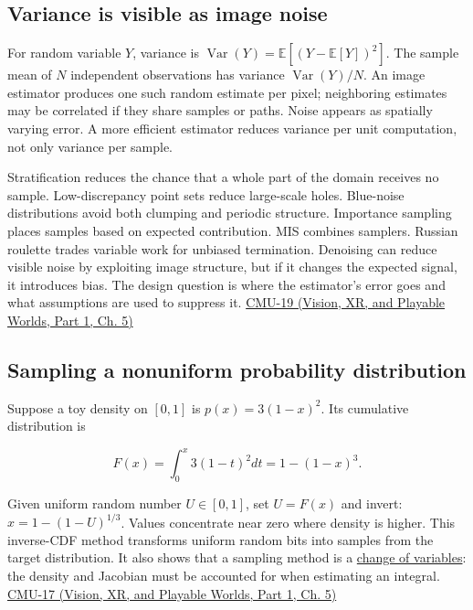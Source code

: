 \subsection{Variance is visible as image noise}\label{03-visual-computing-i-ch012-variance-is-visible-as-image-noise}

\hypertarget{03-visual-computing-i-ch012-variance-is-visible-as-image-noise}{}

For random variable \(Y\), variance is \(\operatorname{Var}(Y)=\mathbb E[(Y-\mathbb E[Y])^2]\). The sample mean of \(N\) independent observations has variance \(\operatorname{Var}(Y)/N\). An image estimator produces one such random estimate per pixel; neighboring estimates may be correlated if they share samples or paths. Noise appears as spatially varying error. A more efficient estimator reduces variance per unit computation, not only variance per sample.

Stratification reduces the chance that a whole part of the domain receives no sample. Low-discrepancy point sets reduce large-scale holes. Blue-noise distributions avoid both clumping and periodic structure. Importance sampling places samples based on expected contribution. MIS combines samplers. Russian roulette trades variable work for unbiased termination. Denoising can reduce visible noise by exploiting image structure, but if it changes the expected signal, it introduces bias. The design question is where the estimator's error goes and what assumptions are used to suppress it. \href{../07-Vision-XR-and-Playable-Worlds-P01/main.pdf\#nameddest=04-visual-computing-ii-ch036-cmu-19---variance-reduction}{CMU-19 (Vision, XR, and Playable Worlds, Part 1, Ch. 5)}

\subsection{Sampling a nonuniform probability distribution}\label{03-visual-computing-i-ch012-sampling-a-nonuniform-probability-distribution}

\hypertarget{03-visual-computing-i-ch012-sampling-a-nonuniform-probability-distribution}{}

Suppose a toy density on \([0,1]\) is \(p(x)=3(1-x)^2\). Its cumulative distribution is

\[
F(x)=\int_0^x3(1-t)^2dt=1-(1-x)^3.
\]

Given uniform random number \(U\in[0,1]\), set \(U=F(x)\) and invert: \(x=1-(1-U)^{1/3}\). Values concentrate near zero where density is higher. This inverse-CDF method transforms uniform random bits into samples from the target distribution. It also shows that a sampling method is a \hyperref[appendix-4815cd87ab8b]{change of variables}: the density and Jacobian must be accounted for when estimating an integral. \href{../07-Vision-XR-and-Playable-Worlds-P01/main.pdf\#nameddest=04-visual-computing-ii-ch036-cmu-17---numerical-integration}{CMU-17 (Vision, XR, and Playable Worlds, Part 1, Ch. 5)}

